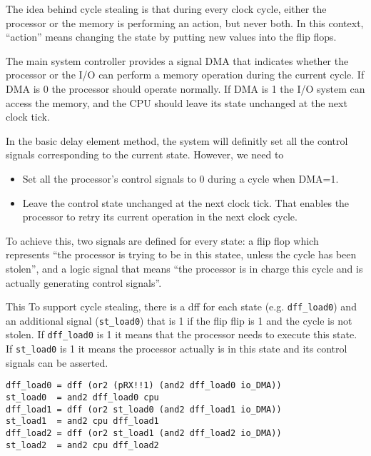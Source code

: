 \documentclass[11pt]{article}
\begin{document}
The idea behind cycle stealing is that during every clock cycle,
either the processor or the memory is performing an action, but never
both.  In this context, ``action'' means changing the state by putting
new values into the flip flops.

The main system controller provides a signal DMA that indicates
whether the processor or the I/O can perform a memory operation during
the current cycle.  If DMA is 0 the processor should operate
normally.  If DMA is 1 the I/O system can access the memory, and the
CPU should leave its state unchanged at the next clock tick.

In the basic delay element method, the system will definitly set all
the control signals corresponding to the current state.  However, we
need to
\begin{itemize}
\item Set all the processor's control signals to 0 during a cycle when DMA=1.
\item Leave the control state unchanged at the next clock tick.  That
enables the processor to retry its current operation in the next
clock cycle.
\end{itemize}


To achieve this, two signals are defined for every state: a flip flop
which represents ``the processor is trying to be in this statee,
unless the cycle has been stolen'', and a logic signal that means
``the processor is in charge this cycle and is actually generating
control signals''.

This 
To support cycle stealing, there is a dff for each state
(e.g. \texttt{dff\_load0}) and an additional signal (\texttt{st\_load0}) that is 1 if
the flip flip is 1 and the cycle is not stolen.  If \texttt{dff\_load0} is 1
it means that the processor needs to execute this state.  If
\texttt{st\_load0} is 1 it means the processor actually is in this state and
its control signals can be asserted.

\begin{verbatim}
dff_load0 = dff (or2 (pRX!!1) (and2 dff_load0 io_DMA))
st_load0  = and2 dff_load0 cpu
dff_load1 = dff (or2 st_load0 (and2 dff_load1 io_DMA))
st_load1  = and2 cpu dff_load1
dff_load2 = dff (or2 st_load1 (and2 dff_load2 io_DMA))
st_load2  = and2 cpu dff_load2
\end{verbatim}
\end{document}
